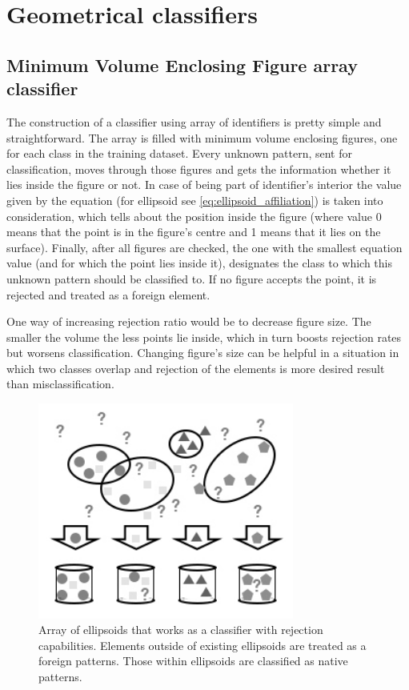 \section{Geometrical classifiers}

\subsection{Minimum Volume Enclosing Figure array classifier}

The construction of a classifier using array of identifiers is pretty simple and straightforward. The array is filled with minimum volume enclosing figures, one for each class in the training dataset. Every unknown pattern, sent for classification, moves through those figures and gets the information whether it lies inside the figure or not. In case of being part of identifier's interior the value given by the equation (for ellipsoid see \ref{eq:ellipsoid_affiliation}) is taken into consideration, which tells about the position inside the figure (where value 0 means that the point is in the figure's centre and 1 means that it lies on the surface). Finally, after all figures are checked, the one with the smallest equation value (and for which the point lies inside it), designates the class to which this unknown pattern should be classified to. If no figure accepts the point, it is rejected and treated as a foreign element. 

One way of increasing rejection ratio would be to decrease figure size. The smaller the volume the less points lie inside, which in turn boosts rejection rates but worsens classification. Changing figure's size can be helpful in a situation in which two classes overlap and rejection of the elements is more desired result than misclassification.

\begin{figure}[htp]
	\centering
	\includegraphics[width=0.75\textwidth]{Figures/ellipsoid_classification.jpg}
	\caption{ Array of ellipsoids that works as a classifier with rejection capabilities. Elements outside of existing ellipsoids are treated as a foreign patterns. Those within ellipsoids are classified as native patterns. }
	\label{fig:ellipsoids_array}\vspace{-3pt}
\end{figure}


